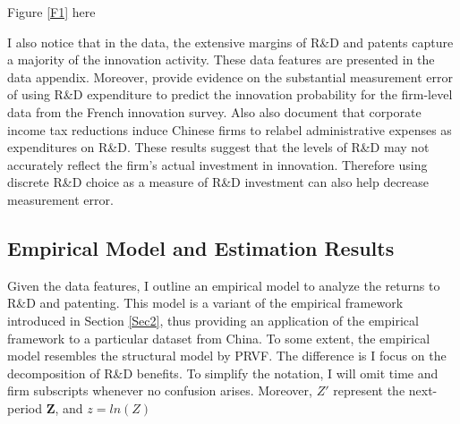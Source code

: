 \documentclass[English]{article}
\begin{document}
\begin{center}
Figure \ref{F1} here
\end{center}

I also notice that in the data, the extensive margins of R\&D and patents capture a majority of the innovation activity. These data features are presented in the data appendix. Moreover, \citet*{mairesse2005} provide evidence on the substantial measurement error of using R\&D expenditure to predict the innovation probability for the firm-level data from the French innovation survey. Also \citet*{chen2017} also document that corporate income tax reductions induce Chinese firms to relabel administrative expenses as expenditures on R\&D. These results suggest that the levels of R\&D may not accurately reflect the firm's actual investment in innovation. Therefore using discrete R\&D choice as a measure of R\&D investment can also help decrease measurement error.

\subsection{Empirical Model and Estimation Results}
Given the data features, I outline an empirical model to analyze the returns to R\&D and patenting. This model is a variant of the empirical framework introduced in Section \ref{Sec2}, thus providing an application of the empirical framework to a particular dataset from China. To some extent, the empirical model resembles the structural model by PRVF. The difference is I focus on the decomposition of R\&D benefits. To simplify the notation, I will omit time and firm subscripts whenever no confusion arises. Moreover, $Z'$ represent the next-period $\mathbf{Z}$, and $z=ln(Z)$
\end{document}
